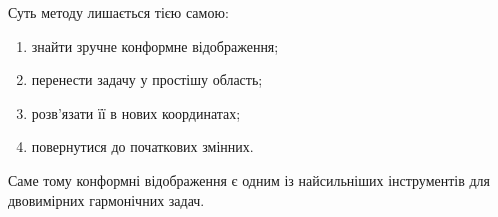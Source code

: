 \documentclass[
  ukrainian,
]{article}
\providecommand{\tightlist}{%
  \setlength{\itemsep}{0pt}\setlength{\parskip}{0pt}}
\begin{document}
Суть методу лишається тією самою:

\begin{enumerate}
\def\labelenumi{\arabic{enumi}.}
\tightlist
\item
  знайти зручне конформне відображення;
\item
  перенести задачу у простішу область;
\item
  розв'язати її в нових координатах;
\item
  повернутися до початкових змінних.
\end{enumerate}

Саме тому конформні відображення є одним із найсильніших інструментів
для двовимірних гармонічних задач.
\end{document}
